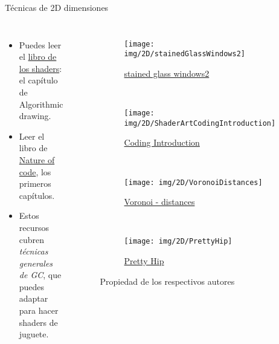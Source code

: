 \begin{frame}{Técnicas de 2D dimensiones}
\begin{columns}
    \begin{itemize}
         \item Puedes leer el \href{https://thebookofshaders.com/05/}{libro de los shaders}: el capítulo de Algorithmic drawing.
         \item Leer el libro de \href{https://natureofcode.com/}{Nature of code}, los primeros capítulos.
         \item Estos recursos cubren \emph{técnicas generales de GC}, que puedes adaptar para hacer shaders de juguete.
     \end{itemize}
\begin{figure}[htp]
 \centering
 \begin{subfigure}[b]{0.42\textwidth}
   \texttt{[image: img/2D/stainedGlassWindows2]}
   \caption{\href{https://www.shadertoy.com/view/3cXSz4}{stained glass windows2}}
 \end{subfigure}
~
 \begin{subfigure}[b]{0.42\textwidth}
   \texttt{[image: img/2D/ShaderArtCodingIntroduction]}
   \caption{\href{https://www.shadertoy.com/view/mtyGWy}{Coding Introduction}}
 \end{subfigure}
\\
 \begin{subfigure}[b]{0.42\textwidth}
   \texttt{[image: img/2D/VoronoiDistances]}
   \caption{\href{https://www.shadertoy.com/view/ldl3W8}{Voronoi - distances}}
 \end{subfigure}
~
 \begin{subfigure}[b]{0.42\textwidth}
   \texttt{[image: img/2D/PrettyHip]}
   \caption{\href{https://www.shadertoy.com/view/XsBfRW}{Pretty Hip}}
 \end{subfigure}
 \caption{Propiedad de los respectivos autores}
\end{figure}
\end{columns}
\end{frame}

